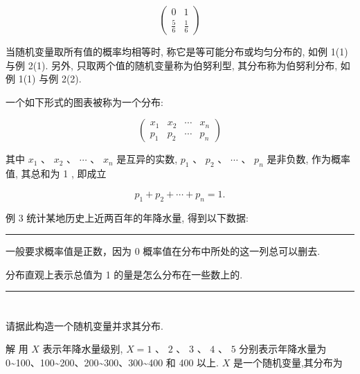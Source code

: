 \documentclass[10pt]{article}
\newcommand{\HRule}{\begin{center}\rule{0.9\linewidth}{0.2mm}\end{center}}
\begin{document}
\[
\left( \begin{matrix} 0 & 1 \\  \frac{5}{6} & \frac{1}{6} \end{matrix}\right)
\]

当随机变量取所有值的概率均相等时, 称它是等可能分布或均匀分布的, 如例 1(1) 与例 2(1). 另外, 只取两个值的随机变量称为伯努利型, 其分布称为伯努利分布, 如例 1(1) 与例 2(2).

一个如下形式的图表被称为一个分布:

\[
\left( \begin{array}{llll} {x}_{1} & {x}_{2} & \cdots & {x}_{n} \\  {p}_{1} & {p}_{2} & \cdots & {p}_{n} \end{array}\right)
\]

其中 \({x}_{1}\text{ 、 }{x}_{2}\text{ 、 }\cdots \text{ 、 }{x}_{n}\) 是互异的实数, \({p}_{1}\text{ 、 }{p}_{2}\text{ 、 }\cdots \text{ 、 }{p}_{n}\) 是非负数, 作为概率值, 其总和为 1 , 即成立

\[
{p}_{1} + {p}_{2} + \cdots  + {p}_{n} = 1.
\]

例 3 统计某地历史上近两百年的年降水量, 得到以下数据:

\begin{center}
\end{center}



\HRule

一般要求概率值是正数，因为 0 概率值在分布中所处的这一列总可以删去.

分布直观上表示总值为 1 的量是怎么分布在一些数上的.

\HRule

\section*{}

请据此构造一个随机变量并求其分布.

解 用 \(X\) 表示年降水量级别, \(X = 1\text{ 、 }2\text{ 、 }3\text{ 、 }4\text{ 、 }5\) 分别表示年降水量为 0\textasciitilde 100、100\textasciitilde 200、200\textasciitilde 300、300\textasciitilde 400 和 400 以上. \(X\) 是一个随机变量,其分布为
\end{document}
